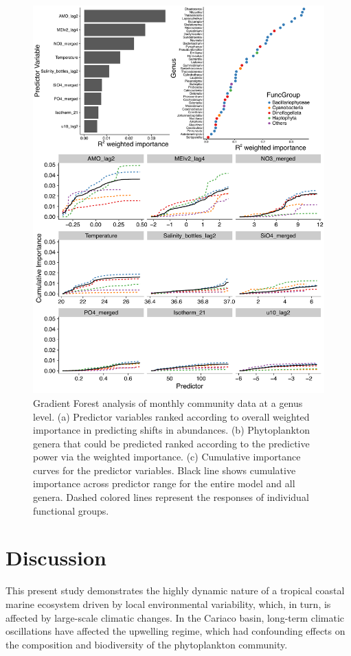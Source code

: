 \documentclass[draft]{agujournal2019}
\begin{document}
\begin{figure}
\noindent\includegraphics[width=\textwidth]{fig/GF_output_plot3_new.pdf}
\caption{Gradient Forest analysis of monthly community data at a genus level. (a) Predictor variables ranked according to overall weighted importance in predicting shifts in abundances. (b) Phytoplankton genera that could be predicted ranked according to the predictive power via the weighted importance. (c) Cumulative importance curves for the predictor variables. Black line shows cumulative importance across predictor range for the entire model and all genera. Dashed colored lines represent the responses of individual functional groups.}
\label{fig:GF}
\end{figure}


\section{Discussion}
This present study demonstrates the highly dynamic nature of a tropical coastal marine ecosystem driven by local environmental variability, which, in turn, is affected by large-scale climatic changes. In the Cariaco basin, long-term climatic oscillations have affected the upwelling regime, which had confounding effects on the composition and biodiversity of the phytoplankton community.  
\end{document}
